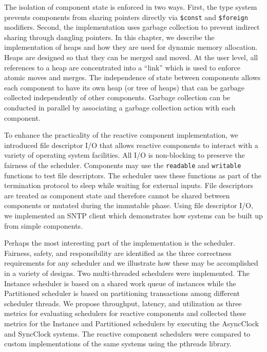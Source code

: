 The isolation of component state is enforced in two ways.
First, the type system prevents components from sharing pointers directly via \verb+$const+ and \verb+$foreign+ modifiers.
Second, the implementation uses garbage collection to prevent indirect sharing through dangling pointers.
In this chapter, we describe the implementation of heaps and how they are used for dynamic memory allocation.
Heaps are designed so that they can be merged and moved.
At the user level, all references to a heap are concentrated into a ``link'' which is used to enforce atomic moves and merges.
The independence of state between components allows each component to have its own heap (or tree of heaps) that can be garbage collected independently of other components.
Garbage collection can be conducted in parallel by associating a garbage collection action with each component.

To enhance the practicality of the reactive component implementation, we introduced file descriptor I/O that allows reactive components to interact with a variety of operating system facilities.
All I/O is non-blocking to preserve the fairness of the scheduler.
Components may use the \verb+readable+ and \verb+writable+ functions to test file descriptors.
The scheduler uses these functions as part of the termination protocol to sleep while waiting for external inputs.
File descriptors are treated as component state and therefore cannot be shared between components or mutated during the immutable phase.
Using file descriptor I/O, we implemented an SNTP client which demonstrates how systems can be built up from simple components.

Perhaps the most interesting part of the implementation is the scheduler.
Fairness, safety, and responsibility are identified as the three correctness requirements for any scheduler and we illustrate how these may be accomplished in a variety of designs.
Two multi-threaded schedulers were implemented.
The Instance scheduler is based on a shared work queue of instances while the Partitioned scheduler is based on partitioning transactions among different scheduler threads.
We propose throughput, latency, and utilization as three metrics for evaluating schedulers for reactive components and collected these metrics for the Instance and Partitioned schedulers by executing the AsyncClock and SyncClock systems.
The reactive component schedulers were compared to custom implementations of the same systems using the pthreads library.

